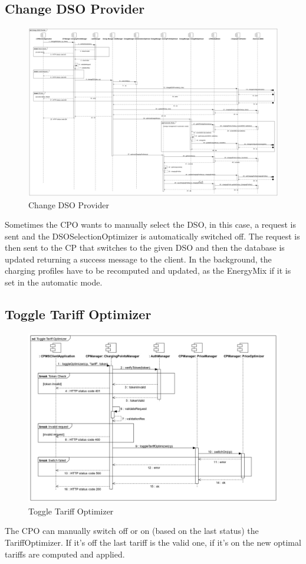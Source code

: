 \documentclass{Configuration_Files/PoliMi3i_thesis}
\begin{document}
\subsection{Change DSO Provider}
\begin{figure}[H]
    \centering
    \includegraphics[width=1\textwidth]{Images/sequenceDiagrams/Change DSO Provider.jpg}
    \caption{Change DSO Provider}
\end{figure}
Sometimes the CPO wants to manually select the DSO, in this case, a request is sent and the DSOSelectionOptimizer is automatically switched off. The request is then sent to the CP that switches to the given DSO and then the database is updated returning a success message to the client. In the background, the charging profiles have to be recomputed and updated, as the EnergyMix if it is set in the automatic mode.

\subsection{Toggle Tariff Optimizer}
\begin{figure}[H]
    \centering
    \includegraphics[width=1\textwidth]{Images/sequenceDiagrams/Toggle Tariff Optimizer.jpg}
    \caption{Toggle Tariff Optimizer}
\end{figure}
The CPO can manually switch off or on (based on the last status) the TariffOptimizer. If it's off the last tariff is the valid one, if it's on the new optimal tariffs are computed and applied.
\end{document}
